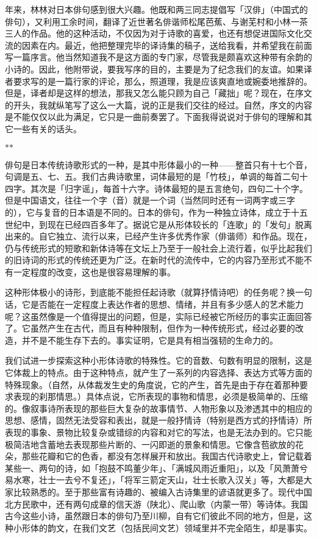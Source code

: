 {    年来，林林对日本俳句感到很大兴趣。他既和两三同志提倡写「汉俳」（中国式的俳句），又利用工余时间，翻译了近世著名俳谐师松尾芭蕉、与谢芜村和小林一茶三人的作品。他的这种活动，不仅因为对于诗歌的喜爱，也还有想促进国际文化交流的因素在内。最近，他把整理完毕的译诗集的稿子，送给我看，并希望我在前面写一篇序言。他当然知道我不是这方面的专门家，尽管我是颇喜欢这种带有余韵的小诗的。因此，他附带说，要我写序的目的，主要是为了纪念我们的友谊。如果译者要求写的是一篇行家的评论，那么，照道理，我是应该爽直地或婉委地推辞的。但是，译者却是这样的想法，那我又怎么能只顾为自己「藏拙」呢？现在，在序文的开头，我就纵笔写了这么一大篇，说的正是我们交往的经过。自然，序文的内容是不能仅仅以此为满足，它只是一曲前奏罢了。下面我得说说对于俳句的理解和其它一些有关的话头。

    \centerline{\hfill$*$\hfill$*$\hfill}

    俳句是日本传统诗歌形式的一种，是其中形体最小的一种——整首只有十七个音，句调是五、七、五。我们古典诗歌里，词体最短的是「竹枝」，单调的每首二句十四字。其次是「归字谣」，每首十六字。诗体最短的是五言绝句，四句二十个字。但是中国语文，往往一个字（音）就是一个词（当然同时还有一词两字或三字的），它与复音的日本语是不同的。日本的俳句，作为一种独立诗体，成立于十五世纪中，到现在已经四百多年了。据说它是从形体较长的「连歌」的「发句」脱离出来的。自它独立、流行以来，已经产生许多优秀作家（俳谐师）和作品。现在，仍与传统形式的短歌和新体诗等在文坛上乃至于一般社会上流行着，似乎比起我们的旧诗词的形式的传统还更为广泛。在新时代的流传中，它的内容乃至形式不能不有一定程度的改变，这也是很容易理解的事。

    这种形体极小的诗形，到底能不能担任起诗歌（就算抒情诗吧）的任务呢？换一句话，它是否能在一定程度上表达作者的思想、情绪，并且有多少感人的艺术能力呢？这虽然像是一个值得提出的问题，但是，实际已经被它所经历的事实正面回答了。它虽然产生在古代，而且有种种限制，但作为一种传统形式，经过必要的改造，并不是不能生存下去的。事实证明，它是具有相当强韧的生命力的。

    我们试进一步探索这种小形体诗歌的特殊性。它的音数、句数有明显的限制，这是它体裁上的特点。由于这种特点，就产生了一系列的内容选择、表达方式等方面的特殊现象。（自然，从体裁发生史的角度说，它的产生，首先是由于存在着那种要求表现的刹那情思。）具体点说，它所表现的事物和情思，必须是极简单的、压缩的。像叙事诗所表现的那些巨大复杂的故事情节、人物形象以及渗透其中的相应的思想、感情，固然无法受容和表出，就是一般抒情诗（特别是西方式的抒情诗）所表现的事象、景物比较复杂或错综的内容和对它的写法，也是无法办到的。它只能极简洁地含蓄地去表现那些片断的、一闪即逝的景象和情思。它像含苞欲放的花朵，那些花瓣和它的色香，都没有怎样展开和放出。我国古代诗歌史上，曾记载着某些一、两句的诗，如「抱鼓不鸣董少年」、「满城风雨近重阳」，以及「风萧萧兮易水寒，壮士一去兮不复还」，「将军三箭定天山，壮士长歌入汉关」等，大都是大家比较熟悉的。至于那些富有诗趣的、被编入古诗集里的谚语就更多了。现代中国北方民歌中，还有两句成章的信天游（陕北）、爬山歌（内蒙一带）等诗体。我国古今这些小诗，虽然跟日本的俳句乃至川柳，自有它们彼此不同的地方，但是，这种小形体的韵文，在我们文艺（包括民间文艺）领域里并不完全陌生，却是事实。

}
